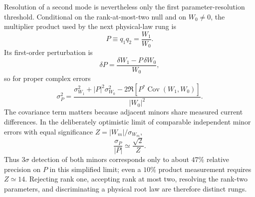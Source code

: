 \documentclass[11pt]{article}
\begin{document}
Resolution of a second mode is nevertheless only the first parameter-resolution threshold.  Conditional on the rank-at-most-two null and on $W_0\neq0$, the multiplier product used by the next physical-law rung is
\begin{equation}
P\equiv q_1q_2=\frac{W_1}{W_0}.
\label{eq:rank2_product_estimator}
\end{equation}
Its first-order perturbation is
\begin{equation}
\boxed{\delta P=\frac{\delta W_1-P\,\delta W_0}{W_0},}
\label{eq:rank2_product_delta}
\end{equation}
so for proper complex errors
\begin{equation}
\boxed{
\sigma_P^2=\frac{\sigma_{W_1}^2+|P|^2\sigma_{W_0}^2-2\Re\!\left[P^*\operatorname{Cov}(W_1,W_0)\right]}{|W_0|^2}.}
\label{eq:rank2_product_cov}
\end{equation}
The covariance term matters because adjacent minors share measured current differences.  In the deliberately optimistic limit of comparable independent minor errors with equal significance $Z=|W_m|/\sigma_{W_m}$,
\begin{equation}
\frac{\sigma_P}{|P|}\simeq\frac{\sqrt2}{Z}.
\end{equation}
Thus $3\sigma$ detection of both minors corresponds only to about $47\%$ relative precision on $P$ in this simplified limit; even a $10\%$ product measurement requires $Z\simeq14$.  Rejecting rank one, accepting rank at most two, resolving the rank-two parameters, and discriminating a physical root law are therefore distinct rungs.
\end{document}
